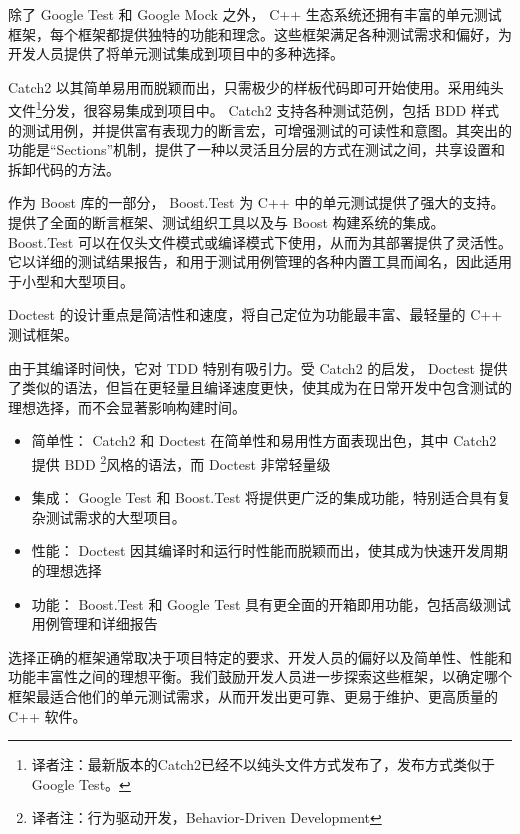 
除了 Google Test 和 Google Mock 之外， C++ 生态系统还拥有丰富的单元测试框架，每个框架都提供独特的功能和理念。这些框架满足各种测试需求和偏好，为开发人员提供了将单元测试集成到项目中的多种选择。


Catch2 以其简单易用而脱颖而出，只需极少的样板代码即可开始使用。采用纯头文件\footnote{译者注：最新版本的Catch2已经不以纯头文件方式发布了，发布方式类似于Google Test。}分发，很容易集成到项目中。 Catch2 支持各种测试范例，包括 BDD 样式的测试用例，并提供富有表现力的断言宏，可增强测试的可读性和意图。其突出的功能是“Sections”机制，提供了一种以灵活且分层的方式在测试之间，共享设置和拆卸代码的方法。


作为 Boost 库的一部分， Boost.Test 为 C++ 中的单元测试提供了强大的支持。提供了全面的断言框架、测试组织工具以及与 Boost 构建系统的集成。 Boost.Test 可以在仅头文件模式或编译模式下使用，从而为其部署提供了灵活性。它以详细的测试结果报告，和用于测试用例管理的各种内置工具而闻名，因此适用于小型和大型项目。


Doctest 的设计重点是简洁性和速度，将自己定位为功能最丰富、最轻量的 C++ 测试框架。

由于其编译时间快，它对 TDD 特别有吸引力。受 Catch2 的启发， Doctest 提供了类似的语法，但旨在更轻量且编译速度更快，使其成为在日常开发中包含测试的理想选择，而不会显著影响构建时间。


\begin{itemize}
\item
简单性： Catch2 和 Doctest 在简单性和易用性方面表现出色，其中 Catch2 提供 BDD \footnote{译者注：行为驱动开发，Behavior-Driven Development}风格的语法，而 Doctest 非常轻量级

\item
集成： Google Test 和 Boost.Test 将提供更广泛的集成功能，特别适合具有复杂测试需求的大型项目。

\item
性能： Doctest 因其编译时和运行时性能而脱颖而出，使其成为快速开发周期的理想选择

\item
功能： Boost.Test 和 Google Test 具有更全面的开箱即用功能，包括高级测试用例管理和详细报告
\end{itemize}

选择正确的框架通常取决于项目特定的要求、开发人员的偏好以及简单性、性能和功能丰富性之间的理想平衡。我们鼓励开发人员进一步探索这些框架，以确定哪个框架最适合他们的单元测试需求，从而开发出更可靠、更易于维护、更高质量的 C++ 软件。

